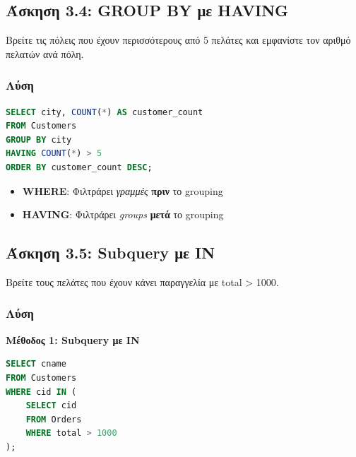 \subsection{Άσκηση 3.4: GROUP BY με HAVING}

\begin{formulabox}[Εκφώνηση]
Βρείτε τις πόλεις που έχουν περισσότερους από 5 πελάτες και εμφανίστε τον αριθμό
πελατών ανά πόλη.
\end{formulabox}

\subsubsection*{Λύση}

\begin{lstlisting}[language=SQL]
SELECT city, COUNT(*) AS customer_count
FROM Customers
GROUP BY city
HAVING COUNT(*) > 5
ORDER BY customer_count DESC;
\end{lstlisting}

\begin{infobox}
\begin{itemize}
    \item \textbf{WHERE}: Φιλτράρει \textit{γραμμές} \textbf{πριν} το grouping
    \item \textbf{HAVING}: Φιλτράρει \textit{groups} \textbf{μετά} το grouping
\end{itemize}
\end{infobox}

\subsection{Άσκηση 3.5: Subquery με IN}

\begin{formulabox}[Εκφώνηση]
Βρείτε τους πελάτες που έχουν κάνει παραγγελία με total > 1000.
\end{formulabox}

\subsubsection*{Λύση}

\textbf{Μέθοδος 1: Subquery με IN}

\begin{lstlisting}[language=SQL]
SELECT cname
FROM Customers
WHERE cid IN (
    SELECT cid
    FROM Orders
    WHERE total > 1000
);
\end{lstlisting}

